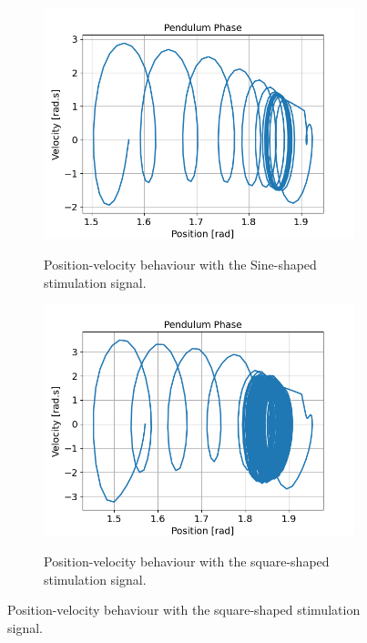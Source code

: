 \documentclass{cmc}
\begin{document}
\begin{figure}[H]
  \centering
  \begin{subfigure}[b]{0.48\textwidth}
    { \centering
      \includegraphics[width=0.99\textwidth]{figures/2b_sine_10HZ_counterphased.png} }
    \caption{Position-velocity behaviour with the Sine-shaped stimulation signal.}
    \label{fig:2c_sine_signal}
  \end{subfigure}
  \begin{subfigure}[b]{0.48\textwidth}
    { \centering
      \includegraphics[width=0.99\textwidth]{figures/2b_square_10HZ_counterphased.png} }
    \caption{Position-velocity behaviour with the square-shaped stimulation signal.}
    \label{fig:2c_sine_phase}
  \end{subfigure}
  

\end{figure}
\end{document}
